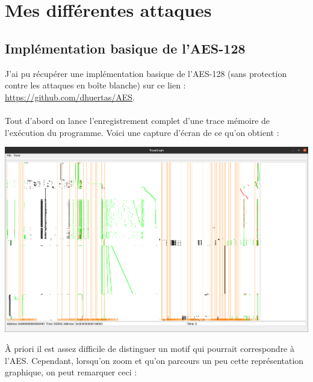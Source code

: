 \documentclass[10pt,a4paper]{article}
\begin{document}
\section{Mes différentes attaques}
\subsection{Implémentation basique de l'AES-128}
J'ai pu récupérer une implémentation basique de l'AES-128 (sans protection contre les attaques en boîte blanche) sur ce lien : \href{https://github.com/dhuertas/AES}{https://github.com/dhuertas/AES}.\\\\
Tout d'abord on lance l'enregistrement complet d'une trace mémoire de l'exécution du programme. Voici une capture d'écran de ce qu'on obtient :

\begin{center}
\includegraphics[scale=0.11]{Images/AES_basique_sans_filtre.png}\\
\end{center}
À priori il est assez difficile de distinguer un motif qui pourrait correspondre à l'AES. Cependant, lorsqu'on zoom et qu'on parcours un peu cette représentation graphique, on peut remarquer ceci :
\end{document}
